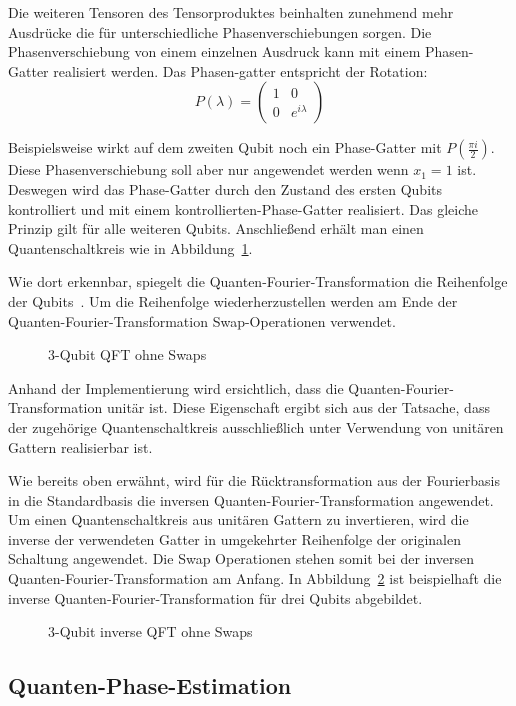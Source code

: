 Die weiteren Tensoren des Tensorproduktes beinhalten zunehmend mehr Ausdrücke die für unterschiedliche Phasenverschiebungen sorgen.
Die Phasenverschiebung von einem einzelnen Ausdruck kann mit einem Phasen-Gatter realisiert werden.
Das Phasen-gatter entspricht der Rotation:
\[
  P(\lambda) = 
  \begin{pmatrix}
    1 & 0 \\
    0 & e^{i \lambda}
  \end{pmatrix}
\]

Beispielsweise wirkt auf dem zweiten Qubit noch ein Phase-Gatter mit \(P(\frac{\pi i}{2} )\).
Diese Phasenverschiebung soll aber nur angewendet werden wenn \(x_1 = 1\) ist.
Deswegen wird das Phase-Gatter durch den Zustand des ersten Qubits kontrolliert und
mit einem kontrollierten-Phase-Gatter realisiert.
Das gleiche Prinzip gilt für alle weiteren Qubits.
Anschließend erhält man einen Quantenschaltkreis wie in Abbildung~\ref{fig:qft}.

Wie dort erkennbar, 
spiegelt die Quanten-Fourier-Transformation die Reihenfolge der Qubits~\cite{Hoever2023QC}.
Um die Reihenfolge wiederherzustellen werden am Ende der Quanten-Fourier-Transformation Swap-Operationen verwendet.
\begin{figure}
\caption{3-Qubit QFT ohne Swaps}
\label{fig:qft}
\centering
\end{figure}

Anhand der Implementierung wird ersichtlich,
dass die Quanten-Fourier-Transformation unitär ist. 
Diese Eigenschaft ergibt sich aus der Tatsache, 
dass der zugehörige Quantenschaltkreis ausschließlich unter Verwendung von unitären Gattern realisierbar ist.

Wie bereits oben erwähnt, 
wird für die Rücktransformation aus der Fourierbasis in die Standardbasis 
die inversen Quanten-Fourier-Transformation angewendet.
Um einen Quantenschaltkreis aus unitären Gattern zu invertieren, 
wird die inverse der verwendeten Gatter
in umgekehrter Reihenfolge der originalen Schaltung angewendet.
Die Swap Operationen stehen somit bei der inversen Quanten-Fourier-Transformation am Anfang.
In Abbildung~\ref{fig:iqft} ist beispielhaft die inverse Quanten-Fourier-Transformation für drei Qubits abgebildet.
\begin{figure}
\caption{3-Qubit inverse QFT ohne Swaps}
\label{fig:iqft}
\centering
\end{figure}

\subsection{Quanten-Phase-Estimation} \label{Quanten-Phase-Estimation}

